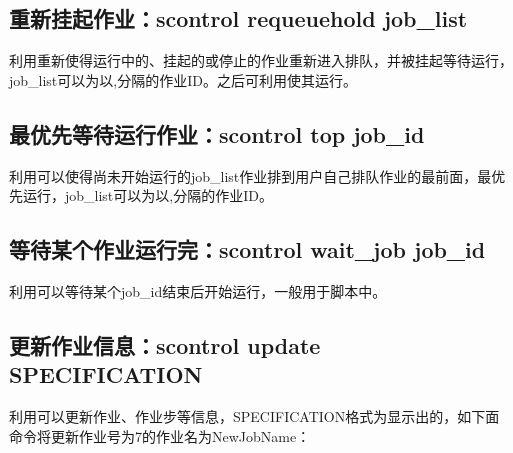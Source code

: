 \subsection{重新挂起作业：scontrol requeuehold job\_list}
利用重新使得运行中的、挂起的或停止的作业重新进入排队，并被挂起等待运行，job\_list可以为以,分隔的作业ID。之后可利用使其运行。


\subsection{最优先等待运行作业：scontrol top job\_id}
利用可以使得尚未开始运行的job\_list作业排到用户自己排队作业的最前面，最优先运行，job\_list可以为以,分隔的作业ID。


\subsection{等待某个作业运行完：scontrol wait\_job job\_id}
利用可以等待某个job\_id结束后开始运行，一般用于脚本中。


\subsection{更新作业信息：scontrol update SPECIFICATION}
利用可以更新作业、作业步等信息，SPECIFICATION格式为显示出的，如下面命令将更新作业号为7的作业名为NewJobName：


